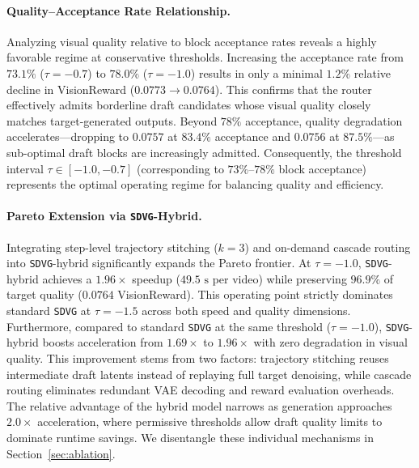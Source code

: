 \documentclass{article} %
\newcommand{\threshold}{\tau}
\begin{document}
\paragraph{Quality--Acceptance Rate Relationship.}
Analyzing visual quality relative to block acceptance rates reveals a highly favorable regime at conservative thresholds. Increasing the acceptance rate from $73.1\%$ ($\threshold = -0.7$) to $78.0\%$ ($\threshold = -1.0$) results in only a minimal $1.2\%$ relative decline in VisionReward ($0.0773 \to 0.0764$). This confirms that the router effectively admits borderline draft candidates whose visual quality closely matches target-generated outputs. Beyond $78\%$ acceptance, quality degradation accelerates—dropping to $0.0757$ at $83.4\%$ acceptance and $0.0756$ at $87.5\%$—as sub-optimal draft blocks are increasingly admitted. Consequently, the threshold interval $\threshold \in [-1.0, -0.7]$ (corresponding to $73\%\text{--}78\%$ block acceptance) represents the optimal operating regime for balancing quality and efficiency.

\paragraph{Pareto Extension via \texttt{SDVG}-Hybrid.}
Integrating step-level trajectory stitching ($k=3$) and on-demand cascade routing into \texttt{SDVG}-hybrid significantly expands the Pareto frontier. At $\threshold = -1.0$, \texttt{SDVG}-hybrid achieves a $\mathbf{1.96\times}$ speedup ($49.5\text{~s}$ per video) while preserving $96.9\%$ of target quality ($0.0764$ VisionReward). This operating point strictly dominates standard \texttt{SDVG} at $\threshold = -1.5$ across both speed and quality dimensions. Furthermore, compared to standard \texttt{SDVG} at the same threshold ($\threshold = -1.0$), \texttt{SDVG}-hybrid boosts acceleration from $1.69\times$ to $1.96\times$ with zero degradation in visual quality. This improvement stems from two factors: trajectory stitching reuses intermediate draft latents instead of replaying full target denoising, while cascade routing eliminates redundant VAE decoding and reward evaluation overheads. The relative advantage of the hybrid model narrows as generation approaches $2.0\times$ acceleration, where permissive thresholds allow draft quality limits to dominate runtime savings. We disentangle these individual mechanisms in Section~\ref{sec:ablation}.
\end{document}
